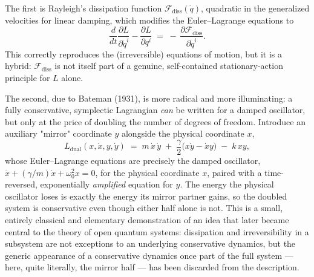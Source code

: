 The first is Rayleigh's dissipation function $\mathcal
F_{\mathrm{diss}}(\dot q)$, quadratic in the generalized velocities
for linear damping, which modifies the Euler--Lagrange equations to
\begin{equation}
  \frac{d}{dt}\frac{\partial L}{\partial \dot q^i}
  - \frac{\partial L}{\partial q^i}
  \;=\; -\,\frac{\partial \mathcal F_{\mathrm{diss}}}{\partial \dot
  q^i}.
  \label{rayleigh}
\end{equation}
This correctly reproduces the (irreversible) equations of motion,
but it is a hybrid: $\mathcal F_{\mathrm{diss}}$ is not itself part
of a genuine, self-contained stationary-action principle for $L$
alone.

The second, due to Bateman (1931), is more radical and more
illuminating: a fully conservative, symplectic Lagrangian \emph{can}
be written for a damped oscillator, but only at the price of
doubling the number of degrees of freedom. Introduce an auxiliary
"mirror" coordinate $y$ alongside the physical coordinate $x$,
\begin{equation}
  L_{\mathrm{dual}}(x,\dot x,y,\dot y) \;=\;
  m\,\dot x\,\dot y \;+\; \frac{\gamma}{2}\bigl(x\dot y - \dot x
  y\bigr) \;-\; k\,xy ,
  \label{bateman}
\end{equation}
whose Euler--Lagrange equations are precisely the damped oscillator,
$\ddot x + (\gamma/m)\dot x + \omega_0^2 x = 0$, for the physical
coordinate $x$, paired with a time-reversed, exponentially
\emph{amplified} equation for $y$. The energy the
physical oscillator loses is exactly the energy its mirror partner
gains, so the doubled system is conservative even though either half
alone is not. This is a small, entirely classical and elementary
demonstration of an idea that later became central to the theory of
open quantum systems: dissipation and irreversibility in a subsystem
are not exceptions to an underlying conservative dynamics, but the
generic appearance of a conservative dynamics once part of the full
system --- here, quite literally, the mirror half --- has been
discarded from the description.


